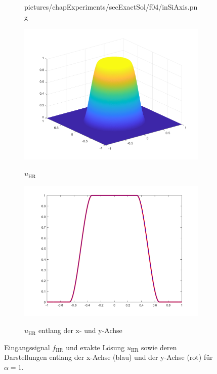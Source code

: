 \begin{figure}[p]
\begin{subfigure}[b]{.48\linewidth}
      {pictures/chapExperiments/secExactSol/f04/inSiAxis.png}
    \label{fig:f04InSiAxis}
  \end{subfigure}

  \begin{subfigure}[b]{.48\linewidth}
    \centering
    \caption{$u_\textrm{HR}$}
    \includegraphics[trim = 40 30 30 30, clip, width=\linewidth]
      {pictures/chapExperiments/secExactSol/f04/exactSolution.png}
    \label{fig:f04ExactSol}
  \end{subfigure}
  \quad
  \begin{subfigure}[b]{.48\linewidth}
    \centering
    \caption{$u_\textrm{HR}$ entlang der x- und y-Achse}
    \includegraphics[trim = 50 30 50 20, clip, width=\linewidth]
      {pictures/chapExperiments/secExactSol/f04/exactSolutionAxis.png}
    \label{fig:f04ExactSolAxis}
  \end{subfigure} 
  \caption{Eingangssignal $f_\textrm{HR}$ und exakte Lösung $u_\textrm{HR}$
  sowie deren Darstellungen entlang der x-Achse (blau) und der y-Achse (rot)
  für $\alpha=1$.}
  \label{fig:f04Plots}
\end{figure}
